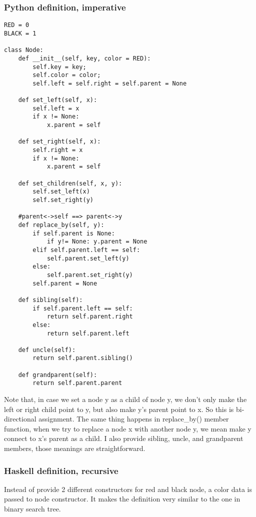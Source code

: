 \documentclass{article}
\begin{document}
\subsubsection*{Python definition, imperative}
\lstset{language=python}
\begin{lstlisting}
RED = 0
BLACK = 1

class Node:
    def __init__(self, key, color = RED):
        self.key = key;
        self.color = color;
        self.left = self.right = self.parent = None

    def set_left(self, x):
        self.left = x
        if x != None:
            x.parent = self

    def set_right(self, x):
        self.right = x
        if x != None:
            x.parent = self

    def set_children(self, x, y):
        self.set_left(x)
        self.set_right(y)

    #parent<->self ==> parent<->y
    def replace_by(self, y):    
        if self.parent is None:
            if y!= None: y.parent = None
        elif self.parent.left == self:
            self.parent.set_left(y)
        else:
            self.parent.set_right(y)
        self.parent = None

    def sibling(self):
        if self.parent.left == self:
            return self.parent.right
        else:
            return self.parent.left

    def uncle(self):
        return self.parent.sibling()

    def grandparent(self):
        return self.parent.parent
\end{lstlisting}

Note that, in case we set a node y as a child of node y, we don't only
make the left or right child point to y, but also make y's parent point to x.
So this is bi-directional assignment. The same thing happens in replace\_by()
member function, when we try to replace a node x with another node y, we
mean make y connect to x's parent as a child. I also provide sibling, uncle,
and grandparent members, those meanings are straightforward.

\subsubsection*{Haskell definition, recursive}
Instead of provide 2 different constructors for red and black node, a color
data is passed to node constructor. It makes the definition very similar to the 
one in binary search tree.
\end{document}
